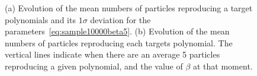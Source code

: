\documentclass[11pt]{article}
\begin{document}
\begin{enumerate}
	  \begin{figure}[h!]
	  	\centering
	  	\caption{(a) Evolution of the mean numbers of particles reproducing a target polynomials and its $1\sigma$ deviation for the parameters~\eqref{eq:sample10000beta5}. (b) Evolution of the mean numbers of particles reproducing each targets polynomial. The vertical lines indicate when there are an average 5 particles reproducing a given polynomial, and the value of $\beta$ at that moment.}
	  	\label{fig:sample10000beta5}
	  \end{figure}


\end{enumerate}
\end{document}
